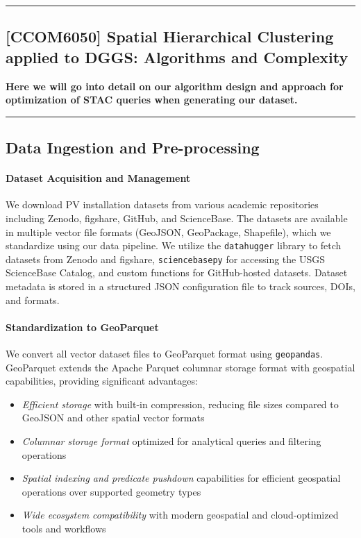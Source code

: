 {\color{gray}\hrule}
\begin{center}
\section{[CCOM6050] Spatial Hierarchical Clustering applied to DGGS: Algorithms and Complexity}
\textbf{Here we will go into detail on our algorithm design and approach for optimization of STAC queries when generating our dataset.}
\bigskip
\end{center}
{\color{gray}\hrule}


\subsection{Data Ingestion and Pre-processing}
\label{subsec:data_ingestion}

\paragraph{Dataset Acquisition and Management} 
We download PV installation datasets from various academic repositories including Zenodo, figshare, GitHub, and ScienceBase. 
The datasets are available in multiple vector file formats (GeoJSON, GeoPackage, Shapefile), which we standardize using our data pipeline. 
We utilize the \texttt{datahugger} library to fetch datasets from Zenodo and figshare, \texttt{sciencebasepy} for accessing the USGS ScienceBase Catalog, 
and custom functions for GitHub-hosted datasets. Dataset metadata is stored in a structured JSON configuration file to track sources, DOIs, and formats. 

\paragraph{Standardization to GeoParquet}
We convert all vector dataset files to GeoParquet format using \texttt{geopandas}. GeoParquet extends the Apache Parquet columnar storage format with geospatial capabilities, providing significant advantages:
\begin{itemize}
    \item \textit{Efficient storage} with built-in compression, reducing file sizes compared to GeoJSON and other spatial vector formats
    \item \textit{Columnar storage format} optimized for analytical queries and filtering operations
    \item \textit{Spatial indexing and predicate pushdown} capabilities for efficient geospatial operations over supported geometry types
    \item \textit{Wide ecosystem compatibility} with modern geospatial and cloud-optimized tools and workflows
\end{itemize}


